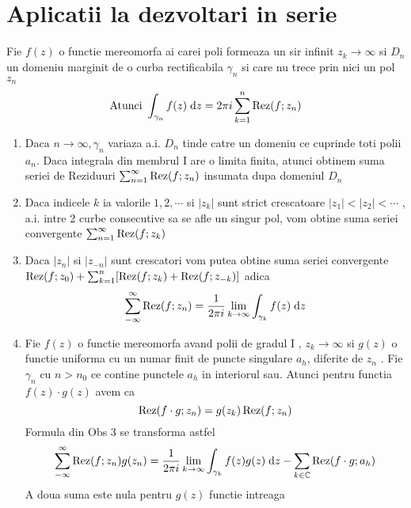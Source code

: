     \section{Aplicatii la dezvoltari in serie}

    \begin{theorem}
        Fie $f(z)$ o functie mereomorfa ai carei poli formeaza un sir infinit $z_k \to \infty$
        si $D_n$ un domeniu marginit de o curba rectificabila $\gamma_n$ si care nu trece
        prin nici un pol $z_n$
        \[
            \text{Atunci } \int_{\gamma_n} f(z) \; \mathrm{d} z = 2\pi i \sum_{k=1}^{n} \operatorname{Rez} (f;z_n)
        \]
    \end{theorem}

    \begin{observation}\leavevmode
        \begin{enumerate}
            \item Daca $n \to \infty, \gamma_n$ variaza a.i. $D_n$ tinde catre un domeniu
                ce cuprinde toti polii $a_n$. Daca integrala din membrul $\mathrm{I}$ are o limita finita,
                atunci obtinem suma seriei de Reziduuri $ \sum_{n=1}^{\infty}\operatorname{Rez}(f;z_n)$ insumata
                dupa domeniul $D_n$
            \item Daca indicele $k$ ia valorile $1,2,\cdots $ si $|z_k|$ sunt strict crescatoare
                $|z_1|<|z_2|< \cdots$ , a.i. intre 2 curbe consecutive sa se afle un singur pol,
                vom obtine suma seriei convergente $\sum_{n=1}^{\infty}\operatorname{Rez}(f;z_k)$
            \item Daca  $|z_n|$ si  $|z_{-n}|$ sunt crescatori vom putea obtine suma seriei
                convergente  $\operatorname{Rez}(f;z_0) + \sum_{k=1}^{n}[\operatorname{Rez}(f;z_k)+ \operatorname{Rez}(f;z_{-k})]$ adica
                \[
                    \sum_{-\infty}^{\infty} \operatorname{Rez}(f;z_n)
                        = \frac{1}{2 \pi i} \lim_{k\to \infty} \int_{\gamma_k} f(z) \; \mathrm{d} z
                \]
            \item Fie $f(z)$ o functie mereomorfa avand polii de gradul $\mathrm{I}$ , $z_k \to \infty$ si
                $g(z)$ o functie uniforma cu un numar finit de puncte singulare $a_h$, diferite de
                $z_n$ . Fie $\gamma_n$ cu $n>n_0$ ce contine punctele $a_h$ in interiorul sau.
                Atunci pentru functia $f(z)\cdot g(z)$ avem ca
                \[
                    \operatorname{Rez}(f\cdot g;z_n)=g(z_k) \operatorname{Rez}(f;z_n)
                \]
                Formula din Obs 3 se transforma astfel
                \[
                    \sum_{-\infty}^{\infty} \operatorname{Rez}(f;z_n) g(z_n)
                        = \frac{1}{2 \pi i} \lim_{k\to \infty} \int_{\gamma_k} f(z)g(z) \; \mathrm{d} z
                        - \sum_{k\in\mathbb{C}} \operatorname{Rez}(f\cdot g; a_h)
                \]
                A doua suma este nula pentru $g(z)$ functie intreaga
        \end{enumerate}
    \end{observation}

